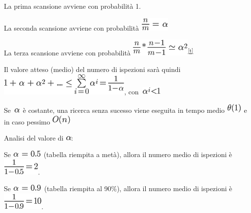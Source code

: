 \documentclass{article}
\begin{document}
{La prima scansione avviene con probabilità 1.}

{La seconda scansione avviene con probabilità
}\includegraphics{images/image323.png}

{La terza scansione avviene con probabilità
}\includegraphics{images/image324.png}\textsuperscript{\protect\hyperlink{cmnt20}{{[}t{]}}}

{Il valore atteso (medio) del numero di ispezioni sarà quindi
}\includegraphics{images/image325.png}{,
con}{~}\includegraphics{images/image326.png}

{}

{Se}{~}\includegraphics{images/image327.png}{~è costante, una ricerca
senza sucesso viene eseguita in tempo medio
}\includegraphics{images/image328.png}{~e in caso pessimo
}\includegraphics{images/image146.png}

{}

{Analisi del valore di }\includegraphics{images/image327.png}{:}

{Se }\includegraphics{images/image329.png}{~(tabella riempita a metà),
allora il numero medio di ispezioni è
}\includegraphics{images/image330.png}{.}

{Se }\includegraphics{images/image331.png}{~(tabella riempita al 90\%),
allora il numero medio di ispezioni è
}\includegraphics{images/image332.png}{.}
\end{document}
